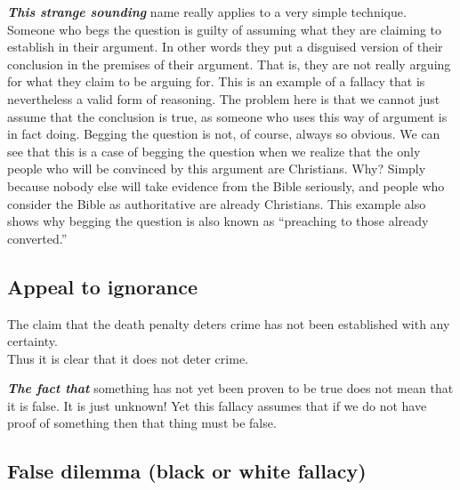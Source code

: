 \documentclass[
  12pt, openany]{book}
\begin{document}
\textbf{\emph{This strange sounding}} name really applies to a very simple technique. Someone who begs the question is guilty of assuming what they are claiming to establish in their argument. In other words they put a disguised version of their conclusion in the premises of their argument. That is, they are not really arguing for what they claim to be arguing for. This is an example of a fallacy that is nevertheless a valid form of reasoning. The problem here is that we cannot just assume that the conclusion is true, as someone who uses this way of argument is in fact doing. Begging the question is not, of course, always so obvious. We can see that this is a case of begging the question when we realize that the only people who will be convinced by this argument are Christians. Why? Simply because nobody else will take evidence from the Bible seriously, and people who consider the Bible as authoritative are already Christians. This example also shows why begging the question is also known as ``preaching to those already converted.''

\hypertarget{appeal-to-ignorance}{%
\subsection*{Appeal to ignorance}\label{appeal-to-ignorance}}


\begin{center}

\begin{argument}

The claim that the death penalty deters crime has not been established with any certainty.\\
Thus it is clear that it does not deter crime.

\end{argument}

\end{center}

\textbf{\emph{The fact that}} something has not yet been proven to be true does not mean that it is false. It is just unknown! Yet this fallacy assumes that if we do not have proof of something then that thing must be false.

\hypertarget{false-dilemma-black-or-white-fallacy}{%
\subsection*{False dilemma (black or white fallacy)}\label{false-dilemma-black-or-white-fallacy}}
\end{document}
